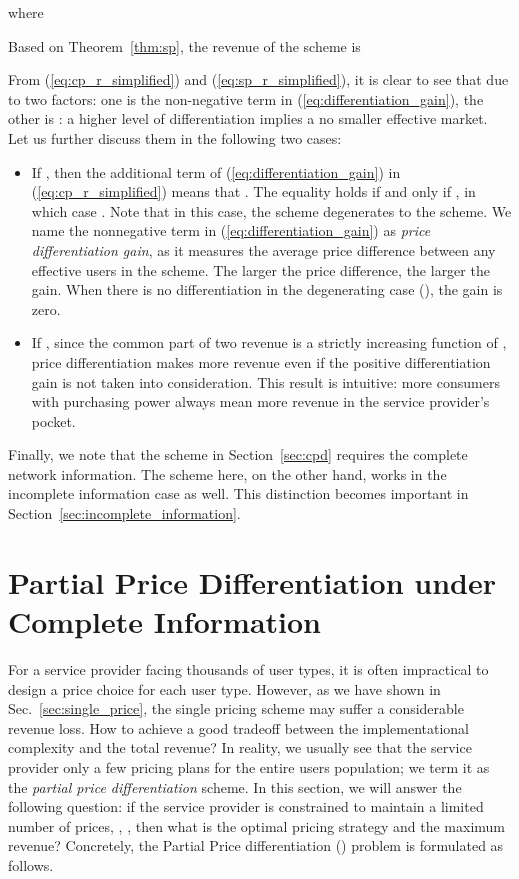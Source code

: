 \documentclass[twocolumn,10pt,twosided]{IEEEtran}
\begin{document}
where

Based on Theorem~\ref{thm:sp}, the revenue of the  scheme is

From (\ref{eq:cp_r_simplified}) and (\ref{eq:sp_r_simplified}), it is clear to see that  due to two factors: one is the non-negative term in (\ref{eq:differentiation_gain}), the other is : a higher level of differentiation implies a no smaller effective market. Let us further discuss them in the following two cases:
\begin{itemize}
  \item If , then the additional term of (\ref{eq:differentiation_gain}) in (\ref{eq:cp_r_simplified}) means that . The equality holds if and only if , in which case . Note that in this case, the  scheme degenerates to the  scheme. We name the nonnegative term  in
(\ref{eq:differentiation_gain})  as \emph{price differentiation gain}, as it measures the average price difference between any effective users in the  scheme. The larger the price difference, the larger the gain. When there is no
differentiation in the degenerating case (), the gain is
zero.
  \item If , since the common part of two revenue  is a strictly increasing function of , price differentiation makes more revenue even if the positive differentiation gain  is not taken into consideration. This result is intuitive: more consumers with purchasing power  always mean more revenue in the service provider's pocket.
\end{itemize}

Finally, we note that the  scheme in Section~\ref{sec:cpd} requires the complete network information. The  scheme here, on the other hand, works in the incomplete information case as well. This distinction becomes important in Section~\ref{sec:incomplete_information}.

\section{Partial Price Differentiation under Complete Information}
\label{sec:PPD}
For a service provider facing thousands of user types, it is often impractical to design a price choice for each user type. 
However, as we have shown in Sec.~\ref{sec:single_price}, the single pricing scheme may suffer a considerable revenue loss.  How to achieve a good  tradeoff  between the implementational complexity and the total revenue?
In reality, we usually see that the service provider  only a few pricing plans for the entire users population; we term it as the \emph{partial price differentiation} scheme. In this section, we will answer the following question: if the service provider is constrained to maintain a limited number of prices, , , then what is the optimal pricing strategy and the maximum revenue?
Concretely, the Partial Price differentiation () problem is formulated as follows.
\end{document}
